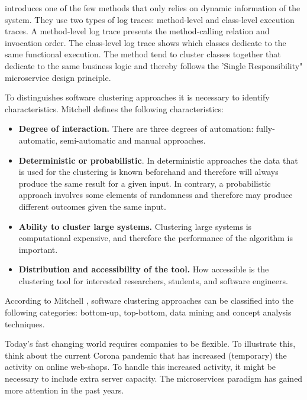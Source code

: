 \par
\citeauthor{jin2018functionality} \cite{jin2018functionality} introduces one of the few methods that only relies on dynamic information of the system. They use two types of log traces: method-level and class-level execution traces. A method-level log trace presents the method-calling relation and invocation order. The class-level log trace shows which classes dedicate to the same functional execution. The method tend to cluster classes together that dedicate to the same business logic and thereby follows the 'Single Responsibility" microservice design principle.


To distinguishes software clustering approaches it is necessary to identify characteristics. Mitchell \cite{mitchell2003heuristic} defines the following characteristics:
\begin{itemize}
    \item \textbf{Degree of interaction.} There are three degrees of automation: fully-automatic, semi-automatic and manual approaches.
    \item \textbf{Deterministic or probabilistic}. In deterministic approaches the data that is used for the clustering is known beforehand and therefore will always produce the same result for a given input. In contrary, a probabilistic approach involves some elements of randomness and therefore may produce different outcomes given the same input.
    \item \textbf{Ability to cluster large systems.} Clustering large systems is computational expensive, and therefore the performance of the algorithm is important.
    \item \textbf{Distribution and accessibility of the tool.} How accessible is the clustering tool for interested researchers, students, and software engineers.
\end{itemize}

According to Mitchell \cite{mitchell2003heuristic}, software clustering approaches can be classified into the following categories: bottom-up, top-bottom, data mining and concept analysis techniques. 

Today's fast changing world requires companies to be flexible. To illustrate this, think about the current Corona pandemic that has increased (temporary) the activity on online web-shops. To handle this increased activity, it might be necessary to include extra server capacity. The microservices paradigm has gained more attention in the past years. 

